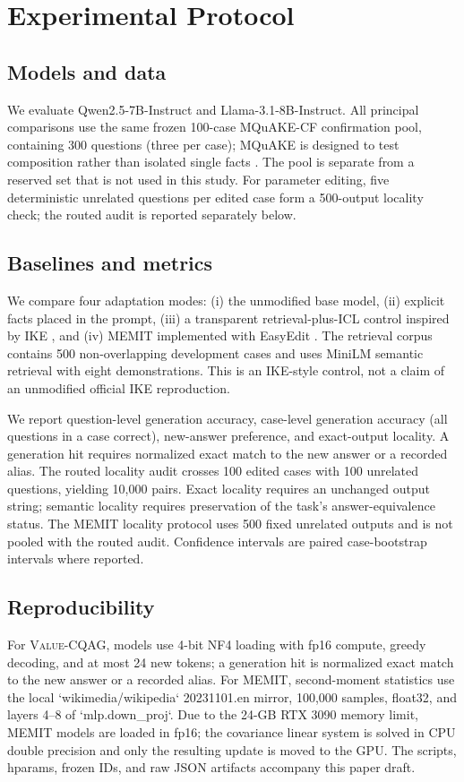 \documentclass{article}
\newcommand{\method}{\textsc{Value-CQAG}}
\newcommand{\memit}{\textsc{MEMIT}}
\begin{document}
\section{Experimental Protocol}
\subsection{Models and data}
We evaluate Qwen2.5-7B-Instruct and Llama-3.1-8B-Instruct. All principal comparisons use the same frozen 100-case MQuAKE-CF confirmation pool, containing 300 questions (three per case); MQuAKE is designed to test composition rather than isolated single facts \cite{zhong2023mquake}. The pool is separate from a reserved set that is not used in this study. For parameter editing, five deterministic unrelated questions per edited case form a 500-output locality check; the routed audit is reported separately below.

\subsection{Baselines and metrics}
We compare four adaptation modes: (i) the unmodified base model, (ii) explicit facts placed in the prompt, (iii) a transparent retrieval-plus-ICL control inspired by IKE \cite{zheng2023ike}, and (iv) \memit{} \cite{meng2023memit} implemented with EasyEdit \cite{wang2024easyedit}. The retrieval corpus contains 500 non-overlapping development cases and uses MiniLM semantic retrieval with eight demonstrations. This is an IKE-style control, not a claim of an unmodified official IKE reproduction.

We report question-level generation accuracy, case-level generation accuracy (all questions in a case correct), new-answer preference, and exact-output locality. A generation hit requires normalized exact match to the new answer or a recorded alias. The routed locality audit crosses 100 edited cases with 100 unrelated questions, yielding 10,000 pairs. Exact locality requires an unchanged output string; semantic locality requires preservation of the task's answer-equivalence status. The \memit{} locality protocol uses 500 fixed unrelated outputs and is not pooled with the routed audit. Confidence intervals are paired case-bootstrap intervals where reported.

\subsection{Reproducibility}
For \method{}, models use 4-bit NF4 loading with fp16 compute, greedy decoding, and at most 24 new tokens; a generation hit is normalized exact match to the new answer or a recorded alias. For \memit{}, second-moment statistics use the local `wikimedia/wikipedia` 20231101.en mirror, 100,000 samples, float32, and layers 4--8 of `mlp.down\_proj`. Due to the 24-GB RTX 3090 memory limit, \memit{} models are loaded in fp16; the covariance linear system is solved in CPU double precision and only the resulting update is moved to the GPU. The scripts, hparams, frozen IDs, and raw JSON artifacts accompany this paper draft.
\end{document}
